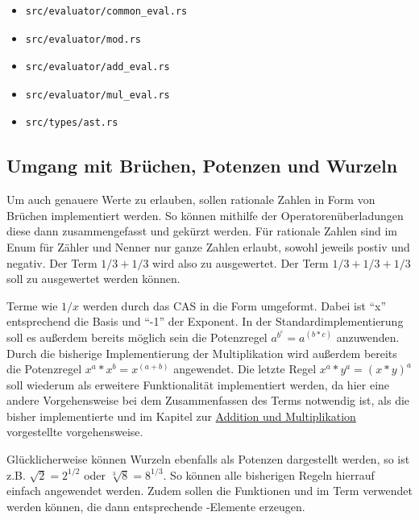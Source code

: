 \documentclass[11pt,a4paper, ngerman]{article}
\begin{document}
\begin{itemize}
    \item \begin{verbatim}src/evaluator/common_eval.rs\end{verbatim}
    \item \begin{verbatim}src/evaluator/mod.rs\end{verbatim}
    \item \begin{verbatim}src/evaluator/add_eval.rs\end{verbatim}
    \item \begin{verbatim}src/evaluator/mul_eval.rs\end{verbatim}
    \item \begin{verbatim}src/types/ast.rs\end{verbatim}
\end{itemize}

\subsection{Umgang mit Brüchen, Potenzen und Wurzeln}
Um auch genauere Werte zu erlauben, sollen rationale Zahlen in Form von Brüchen implementiert werden. So können mithilfe der Operatorenüberladungen diese dann zusammengefasst und gekürzt werden. Für rationale Zahlen sind im Enum  für Zähler und Nenner nur ganze Zahlen erlaubt, sowohl jeweils postiv und negativ. Der Term $1/3+1/3$ wird also zu  ausgewertet. Der Term $1/3+1/3+1/3$ soll zu  ausgewertet werden können.

Terme wie $1/x$ werden durch das CAS in die Form  umgeformt. Dabei ist ``x'' entsprechend die Basis und ``-1'' der Exponent. In der Standardimplementierung soll es außerdem bereits möglich sein die Potenzregel $a^{b^{c}} = a^{(b*c)}$ anzuwenden. Durch die bisherige Implementierung der Multiplikation wird außerdem bereits die Potenzregel $x^a*x^b = x^{(a+b)}$ angewendet. Die letzte Regel $x^a*y^a = (x*y)^a$ soll wiederum als erweitere Funktionalität implementiert werden, da hier eine andere Vorgehensweise bei dem Zusammenfassen des Terms notwendig ist, als die bisher implementierte und im Kapitel zur \hyperref[sec:kapAddnundMult]{Addition und Multiplikation} vorgestellte vorgehensweise.

Glücklicherweise können Wurzeln ebenfalls als Potenzen dargestellt werden, so ist z.B. $\sqrt{2} = 2^{1/2}$ oder $\sqrt[3]{8} = 8^{1/3}$. So können alle bisherigen Regeln hierrauf einfach angewendet werden. Zudem sollen die Funktionen  und  im Term verwendet werden können, die dann entsprechende -Elemente erzeugen.
\end{document}
